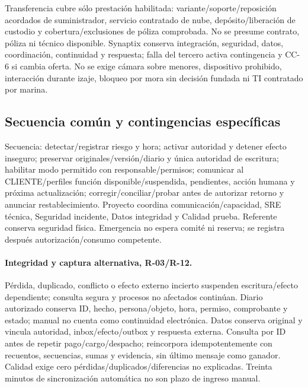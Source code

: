 Transferencia cubre sólo prestación habilitada: variante/soporte/reposición acordados de suministrador, servicio contratado de nube, depósito/liberación de custodio y cobertura/exclusiones de póliza comprobada. No se presume contrato, póliza ni técnico disponible. Synaptix conserva integración, seguridad, datos, coordinación, continuidad y respuesta; falla del tercero activa contingencia y CC-6 si cambia oferta. No se exige cámara sobre menores, dispositivo prohibido, interacción durante izaje, bloqueo por mora sin decisión fundada ni TI contratado por marina. \parencites[arts.~17 y 72; pp.~12--13, 38]{sd8-ba}[cap.~10]{sd8-c07}

\subsection{Secuencia común y contingencias específicas}\label{sec:sd8-contingencia-p06}
Secuencia: detectar/registrar riesgo y hora; activar autoridad y detener efecto inseguro; preservar originales/versión/diario y única autoridad de escritura; habilitar modo permitido con responsable/permisos; comunicar al CLIENTE/perfiles función disponible/suspendida, pendientes, acción humana y próxima actualización; corregir/conciliar/probar antes de autorizar retorno y anunciar restablecimiento. Proyecto coordina comunicación/capacidad, SRE técnica, Seguridad incidente, Datos integridad y Calidad prueba. Referente conserva seguridad física. Emergencia no espera comité ni reserva; se registra después autorización/consumo competente.

\paragraph{Integridad y captura alternativa, R-03/R-12.}
Pérdida, duplicado, conflicto o efecto externo incierto suspenden escritura/efecto dependiente; consulta segura y procesos no afectados continúan. Diario autorizado conserva ID, hecho, persona/objeto, hora, permiso, comprobante y estado; manual no cuenta como continuidad electrónica. Datos conserva original y vincula autoridad, inbox/efecto/outbox y respuesta externa. Consulta por ID antes de repetir pago/cargo/despacho; reincorpora idempotentemente con recuentos, secuencias, sumas y evidencia, sin último mensaje como ganador. Calidad exige cero pérdidas/duplicados/diferencias no explicadas. Treinta minutos de sincronización automática no son plazo de ingreso manual. \parencite[cap.~15, sincronización RT-03.13, p.~33; numeral~17.6]{sd8-c07}

